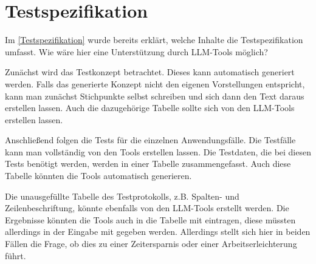 \section{Testspezifikation}  \label{LLMTestspezifikation}

Im \autoref{Testspezifikation} wurde bereits erklärt, welche Inhalte die Testspezifikation umfasst. Wie wäre hier eine 
Unterstützung durch LLM-Tools möglich?

Zunächst wird das Testkonzept betrachtet. Dieses kann automatisch generiert werden. Falls das generierte Konzept nicht den 
eigenen Vorstellungen entspricht, kann man zunächst Stichpunkte selbst schreiben und sich dann den Text daraus 
erstellen lassen. Auch die dazugehörige Tabelle sollte sich von den LLM-Tools erstellen lassen.

Anschließend folgen die Tests für die einzelnen Anwendungsfälle. Die Testfälle kann man vollständig von den Tools 
erstellen lassen. Die Testdaten, die bei diesen Tests benötigt werden, werden in einer Tabelle zusammengefasst. 
Auch diese Tabelle könnten die Tools automatisch generieren.

Die unausgefüllte Tabelle des Testprotokolls, z.B. Spalten- und Zeilenbeschriftung, könnte ebenfalls von den LLM-Tools erstellt werden. Die Ergebnisse 
könnten die Tools auch in die Tabelle mit eintragen, diese müssten allerdings in der Eingabe mit gegeben werden. 
Allerdings stellt sich hier in beiden Fällen die Frage, ob dies zu einer Zeitersparnis oder einer Arbeitserleichterung führt.